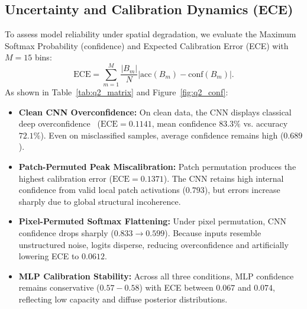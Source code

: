 \subsection{Uncertainty and Calibration Dynamics (ECE)}
To assess model reliability under spatial degradation, we evaluate the Maximum Softmax Probability (confidence) and Expected Calibration Error (ECE) with $M=15$ bins:
\begin{equation}
    \text{ECE} = \sum_{m=1}^M \frac{|B_m|}{N} \left| \text{acc}(B_m) - \text{conf}(B_m) \right|.
\end{equation}
As shown in Table~\ref{tab:q2_matrix} and Figure~\ref{fig:q2_conf}:
\begin{itemize}
    \item \textbf{Clean CNN Overconfidence:} On clean data, the CNN displays classical deep overconfidence~\cite{guo2017calibration} ($\text{ECE} = 0.1141$, mean confidence $83.3\%$ vs. accuracy $72.1\%$). Even on misclassified samples, average confidence remains high ($0.689$).
    \item \textbf{Patch-Permuted Peak Miscalibration:} Patch permutation produces the highest calibration error ($\text{ECE} = 0.1371$). The CNN retains high internal confidence from valid local patch activations ($0.793$), but errors increase sharply due to global structural incoherence.
    \item \textbf{Pixel-Permuted Softmax Flattening:} Under pixel permutation, CNN confidence drops sharply ($0.833 \to 0.599$). Because inputs resemble unstructured noise, logits disperse, reducing overconfidence and artificially lowering ECE to $0.0612$.
    \item \textbf{MLP Calibration Stability:} Across all three conditions, MLP confidence remains conservative ($0.57-0.58$) with ECE between $0.067$ and $0.074$, reflecting low capacity and diffuse posterior distributions.
\end{itemize}

